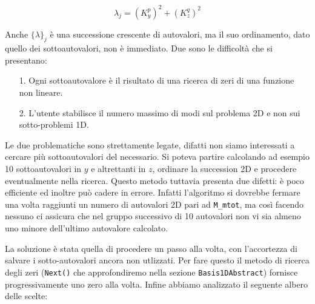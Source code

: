 \begin{equation}
\label{eq: autovalori}
 \lambda_j = (K_y^p)^2 + (K_z^q)^2
\end{equation} 

Anche $\{\lambda\}_j$ \`e una successione crescente di autovalori, ma il suo ordinamento, dato quello dei sottoautovalori, non \`e immediato. Due sono le difficolt\`a che si presentano:
\begin{itemize}
\item[1.] Ogni sottoautovalore \`e il risultato di una ricerca di zeri di una funzione non lineare.
\item[2.] L'utente stabilisce il numero massimo di modi sul problema 2D e non sui sotto-problemi 1D.
\end{itemize}

Le due problematiche sono strettamente legate, difatti non siamo interessati a cercare pi\`u sottoautovalori del necessario. Si poteva partire calcolando ad esempio 10 sottoautovalori in $y$ e altrettanti in $z$, ordinare la succession 2D e procedere eventualmente nella ricerca. Questo metodo tuttavia presenta due difetti: \`e poco efficiente ed inoltre pu\`o cadere in errore. Infatti l'algoritmo si dovrebbe fermare una volta raggiunti un numero di autovalori 2D pari ad \texttt{M\_mtot}, ma cos\`i facendo nessuno ci assicura che nel gruppo successivo di 10 autovalori non vi sia almeno uno minore dell'ultimo autovalore calcolato.

La soluzione \`e stata quella di procedere un passo alla volta, con l'accortezza di salvare i sotto-autovalori ancora non utlizzati. Per fare questo il metodo di ricerca degli zeri (\texttt{Next()} che approfondiremo nella sezione \texttt{Basis1DAbstract}) fornisce progressivamente uno zero alla volta. Infine abbiamo analizzato il seguente albero delle scelte:


